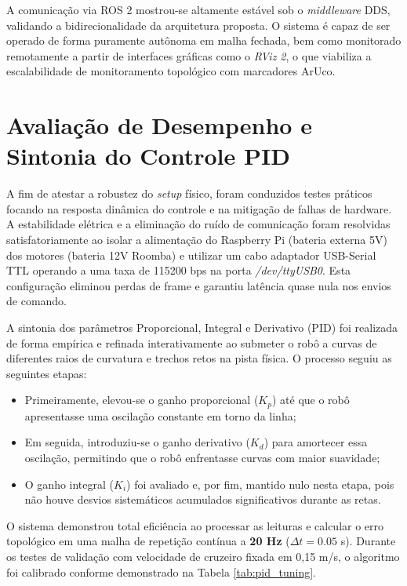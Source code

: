 A comunicação via ROS 2 mostrou-se altamente estável sob o \textit{middleware} DDS, validando a bidirecionalidade da arquitetura proposta. O sistema é capaz de ser operado de forma puramente autônoma em malha fechada, bem como monitorado remotamente a partir de interfaces gráficas como o \textit{RViz 2}, o que viabiliza a escalabilidade de monitoramento topológico com marcadores ArUco.

\section{Avaliação de Desempenho e Sintonia do Controle PID}

A fim de atestar a robustez do \textit{setup} físico, foram conduzidos testes práticos focando na resposta dinâmica do controle e na mitigação de falhas de hardware. A estabilidade elétrica e a eliminação do ruído de comunicação foram resolvidas satisfatoriamente ao isolar a alimentação do Raspberry Pi (bateria externa 5V) dos motores (bateria 12V Roomba) e utilizar um cabo adaptador USB-Serial TTL operando a uma taxa de 115200 bps na porta \textit{/dev/ttyUSB0}. Esta configuração eliminou perdas de frame e garantiu latência quase nula nos envios de comando.

A sintonia dos parâmetros Proporcional, Integral e Derivativo (PID) foi realizada de forma empírica e refinada interativamente ao submeter o robô a curvas de diferentes raios de curvatura e trechos retos na pista física. O processo seguiu as seguintes etapas:
\begin{itemize}
    \item Primeiramente, elevou-se o ganho proporcional ($K_p$) até que o robô apresentasse uma oscilação constante em torno da linha;
    \item Em seguida, introduziu-se o ganho derivativo ($K_d$) para amortecer essa oscilação, permitindo que o robô enfrentasse curvas com maior suavidade;
    \item O ganho integral ($K_i$) foi avaliado e, por fim, mantido nulo nesta etapa, pois não houve desvios sistemáticos acumulados significativos durante as retas.
\end{itemize}

O sistema demonstrou total eficiência ao processar as leituras e calcular o erro topológico em uma malha de repetição contínua a \textbf{20 Hz} ($\Delta t = 0.05$ s). Durante os testes de validação com velocidade de cruzeiro fixada em 0,15 m/s, o algoritmo foi calibrado conforme demonstrado na Tabela \ref{tab:pid_tuning}.

